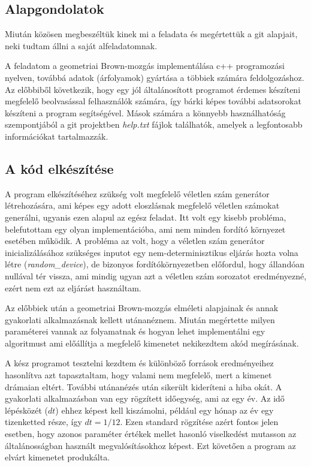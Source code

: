 \documentclass[a4paper, 12pt]{article}
\numberwithin{equation}{section}          %
\numberwithin{figure}{subsection}
\begin{document}
		\subsection{Alapgondolatok}
	
		Miután közösen megbeszéltük kinek mi a feladata és megértettük a git alapjait, neki
		tudtam állni a saját alfeladatomnak.
		
		A feladatom a geometriai Brown-mozgás implementálása c++ programozási nyelven,
		továbbá adatok (árfolyamok) gyártása a többiek számára feldolgozáshoz.
		Az előbbiből következik, hogy egy jól általánosított programot érdemes készíteni
		megfelelő beolvasással felhasználók számára, így bárki képes további adatsorokat készíteni
		a program segítségével. Mások számára a könnyebb használhatóság szempontjából a
		git projektben \textit{help.txt} fájlok találhatók, amelyek a legfontosabb információkat
		tartalmazzák.
		
		\subsection{A kód elkészítése}
		
		A program elkészítéséhez szükség volt megfelelő véletlen szám generátor létrehozására,
		ami képes egy adott eloszlásnak megfelelő véletlen számokat generálni, ugyanis ezen alapul
		az egész feladat. Itt volt egy kisebb probléma, belefutottam egy olyan implementációba,
		ami nem minden fordító környezet esetében működik. A probléma az volt, hogy a véletlen
		szám generátor inicializálásához szükséges inputot egy nem-determinisztikus eljárás
		hozta volna létre (\textit{random\_device}), de bizonyos fordítókörnyezetben előfordul,
		hogy állandóan nullával tér vissza, ami mindig ugyan azt a véletlen szám sorozatot
		eredményezné, ezért nem ezt az eljárást használtam.
		
		Az előbbiek után a geometriai Brown-mozgás elméleti alapjainak és annak gyakorlati
		alkalmazásnak kellett utánanéznem. Miután megértette milyen paraméterei vannak
		az folyamatnak és hogyan lehet implementálni egy algoritmust ami előállítja a megfelelő
		kimenetet nekikezdtem akód megírásának.
		
		A kész programot tesztelni kezdtem és különböző források eredményeihez hasonlítva
		azt tapasztaltam, hogy valami nem megfelelő, mert a kimenet drámaian eltért.
		További utánanézés után sikerült kideríteni a hiba okát. A gyakorlati alkalmazásban
		van egy rögzített időegység, ami az egy év. Az idő lépésközét ($dt$) ehhez képest kell
		kiszámolni, például egy hónap az év egy tizenketted része, így $dt = 1/12$.
		Ezen standard rögzítése azért fontos jelen esetben, hogy azonos paraméter értékek
		mellet hasonló viselkedést mutasson az általánosságban használt megvalósításokhoz
		képest. Ezt követően a program az elvárt kimenetet produkálta.
		
\end{document}
